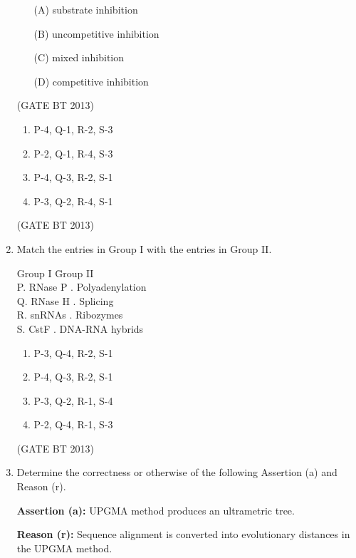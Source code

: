 \documentclass[journal,12pt,onecolumn]{IEEEtran}
\theoremstyle{remark}
\begin{document}
\begin{enumerate}
    \begin{enumerate}
        \item[(A)] substrate inhibition
        \item[(B)] uncompetitive inhibition
        \item[(C)] mixed inhibition
        \item[(D)] competitive inhibition
    \end{enumerate} \hfill(GATE BT 2013)


\begin{enumerate}
    \item P-4, Q-1, R-2, S-3
    \item P-2, Q-1, R-4, S-3
    \item P-4, Q-3, R-2, S-1
    \item P-3, Q-2, R-4, S-1
\end{enumerate} \hfill(GATE BT 2013)

\item 

Match the entries in Group I with the entries in Group II.

\begin{tabbing}
Group I \hspace{3.5cm} \= Group II \\
P. RNase P . Polyadenylation \\
Q. RNase H . Splicing \\
R. snRNAs . Ribozymes \\
S. CstF . DNA-RNA hybrids \\
\end{tabbing}

\begin{enumerate}
    \item P-3, Q-4, R-2, S-1
    \item P-4, Q-3, R-2, S-1
    \item P-3, Q-2, R-1, S-4
    \item P-2, Q-4, R-1, S-3
\end{enumerate} \hfill(GATE BT 2013)

\item 

Determine the correctness or otherwise of the following Assertion (a) and Reason (r).

\textbf{Assertion (a):} UPGMA method produces an ultrametric tree.

\textbf{Reason (r):} Sequence alignment is converted into evolutionary distances in the UPGMA method.


\end{enumerate}
\end{document}
